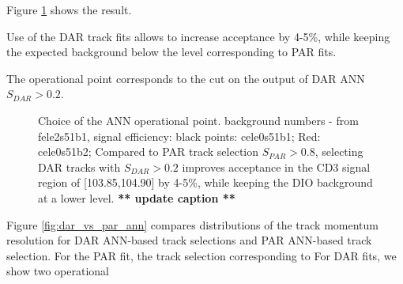 Figure \ref{fig:ann_operational_point_choice} shows the result.

Use of the DAR track fits allows to increase acceptance by 4-5\%, while keeping the expected
background below the level corresponding to PAR fits.

The operational point corresponds to the cut on the output of DAR ANN $S_{DAR} > 0.2$.

\begin{figure}
\caption{
  \label{fig:ann_operational_point_choice}
  Choice of the ANN operational point. background numbers - from fele2s51b1,
  signal efficiency: black points: cele0s51b1; Red: cele0s51b2;
  Compared to PAR track selection $S_{PAR} > 0.8$, selecting DAR tracks with $S_{DAR} > 0.2$ 
  improves acceptance in the CD3 signal region of [103.85,104.90] by 4-5\%, 
  while keeping the DIO background at a lower level.
  {\color{red} {\bf *** update caption **}}
}
\end{figure}

Figure \ref{fig:dar_vs_par_ann} compares distributions of the track momentum resolution for DAR ANN-based track
selections and PAR ANN-based track selection. For the PAR fit, the track selection corresponding to For DAR fits, we show two operational 

